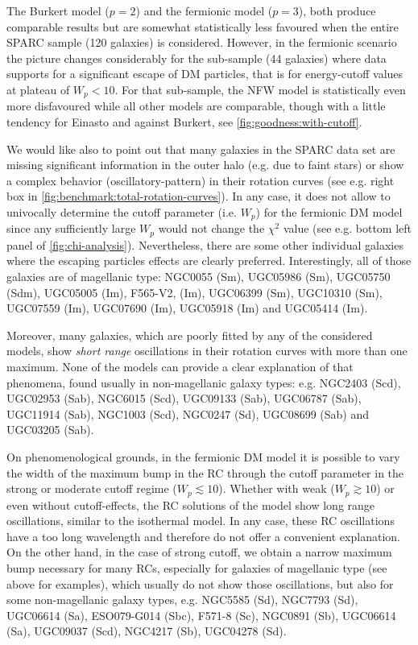 \begin{asparaenum}[(i)]
    \item The Burkert model ($p=2$) and the fermionic model ($p=3$), both produce comparable results but are somewhat statistically less favoured when the entire SPARC sample (120 galaxies) is considered. However, in the fermionic scenario the picture changes considerably for the sub-sample (44 galaxies) where data supports for a significant escape of DM particles, that is for energy-cutoff values at plateau of $W_p < 10$. For that sub-sample, the NFW model is statistically even more disfavoured while all other models are comparable, though with a little tendency for Einasto and against Burkert, see \cref{fig:goodness:with-cutoff}.
\end{asparaenum}

We would like also to point out that many galaxies in the SPARC data set are missing significant information in the outer halo (e.g. due to faint stars) or show a complex behavior (oscillatory-pattern) in their rotation curves (see e.g. right box in \cref{fig:benchmark:total-rotation-curves}). In any case, it does not allow to univocally determine the cutoff parameter (i.e. $W_p$) for the fermionic DM model since any sufficiently large $W_p$ would not change the $\chi^2$ value (see e.g. bottom left panel of \cref{fig:chi-analysis}). Nevertheless, there are some other individual galaxies where the escaping particles effects are clearly preferred. Interestingly, all of those galaxies are of magellanic type: NGC0055 (Sm), UGC05986 (Sm), UGC05750 (Sdm), UGC05005 (Im), F565-V2, (Im), UGC06399 (Sm), UGC10310 (Sm), UGC07559 (Im), UGC07690 (Im), UGC05918 (Im) and UGC05414 (Im).

Moreover, many galaxies, which are poorly fitted by any of the considered models, show \textit{short range} oscillations in their rotation curves with more than one maximum. None of the models can provide a clear explanation of that phenomena, found usually in non-magellanic galaxy types: e.g. NGC2403 (Scd), UGC02953 (Sab), NGC6015 (Scd), UGC09133 (Sab), UGC06787 (Sab), UGC11914 (Sab), NGC1003 (Scd), NGC0247 (Sd), UGC08699 (Sab) and UGC03205 (Sab).

On phenomenological grounds, in the fermionic DM model it is possible to vary the width of the maximum bump in the RC through the cutoff parameter in the strong or moderate cutoff regime ($W_p \lesssim 10$). Whether with weak ($W_p \gtrsim 10$) or even without cutoff-effects, the RC solutions of the model show long range oscillations, similar to the isothermal model. In any case, these RC oscillations have a too long wavelength and therefore do not offer a convenient explanation. On the other hand, in the case of strong cutoff, we obtain a narrow maximum bump necessary for many RCs, especially for galaxies of magellanic type (see above for examples), which usually do not show those oscillations, but also for some non-magellanic galaxy types, e.g. NGC5585 (Sd), NGC7793 (Sd), UGC06614 (Sa), ESO079-G014 (Sbc), F571-8 (Sc), NGC0891 (Sb), UGC06614 (Sa), UGC09037 (Scd), NGC4217 (Sb), UGC04278 (Sd).

